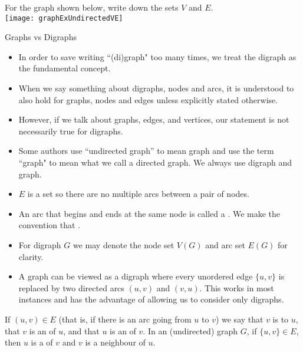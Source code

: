 \begin{Boxample}[0] \label{ex:graph}
For the graph shown below, write down the sets $V$ and $E$.\\
\newline 
\texttt{[image: graphExUndirectedVE]}
\end{Boxample}




\begin{note}
Graphs vs Digraphs
\begin{itemize}
  \item In order to save writing ``(di)graph" too many times, we treat the digraph as the fundamental concept.
  \item When we say something about digraphs, nodes and arcs, it is understood to also hold for graphs, nodes and edges unless explicitly stated otherwise. 
  \item However, if we talk about graphs, edges, and vertices, our statement is not necessarily true for digraphs. 
  \item Some authors use ``undirected graph'' to mean graph and use the term ``graph" to mean what we call a directed graph. We always use digraph and graph.
  \item $E$ is a set so there are no multiple arcs between a pair of nodes.
 \item  An arc that begins and ends at the same node is called a . 
  We make the convention that . 
  \item For digraph $G$ we may denote the node set $V(G)$
  and arc set $E(G)$ for clarity.
  \item A graph can be viewed as a digraph where every unordered edge $\{u, v\}$ 
  is replaced by two directed arcs $(u, v)$ and $(v, u)$.  
  This works in most instances and has the advantage of allowing us to consider only digraphs.
 \end{itemize}
\end{note}


\begin{Definition}\label{def:adjacent}  
If $(u, v)\in E$ (that is, if there is an arc going from $u$ to $v$) we say that $v$ is  
to $u$, that $v$ is an  of $u$, and that $u$ is an  of $v$.
In an (undirected) graph $G$, if $\{u, v\} \in E$, then $u$ is a  of $v$ and $v$ is a neighbour of $u$. 
\end{Definition}


